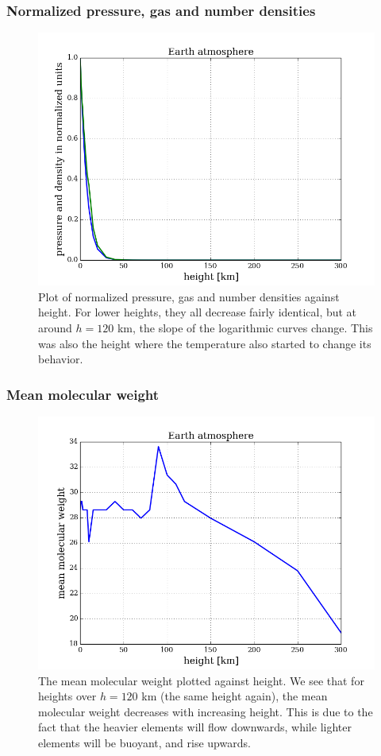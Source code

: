 \documentclass{article}
\begin{document}
\subsubsection{Normalized pressure, gas and number densities}
\begin{figure}[H]
  \centering
  \includegraphics[scale=0.5]{../figures/earth/earth_h_PN.png}
  \caption{Plot of normalized pressure, gas and number densities against height. For lower heights, they all decrease fairly identical, but at around $h=120$ km, the slope of the logarithmic curves change. This was also the height where the temperature also started to change its behavior.}
\end{figure}

\subsubsection{Mean molecular weight}
\begin{figure}[H]
  \centering
  \includegraphics[scale=0.5]{../figures/earth/earth_h_mu.png}
  \caption{The mean molecular weight plotted against height. We see that for heights over $h=120$ km (the same height again), the mean molecular weight decreases with increasing height. This is due to the fact that the heavier elements will flow downwards, while lighter elements will be buoyant, and rise upwards.}
\end{figure}
\end{document}
